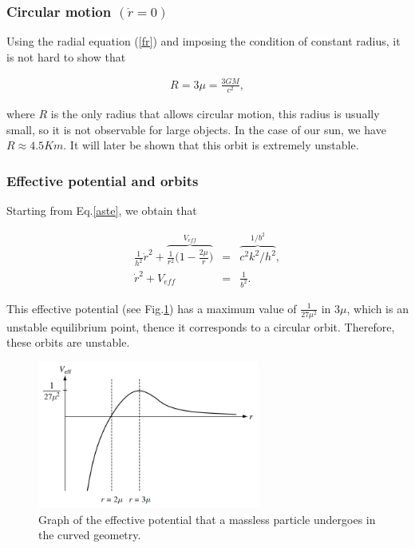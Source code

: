 \documentclass[letterpaper,11pt,onecolumn]{article}
\begin{document}
\subsubsection{Circular motion $(\dot{r}=0)$}

Using the radial equation (\ref{fr}) and imposing the condition of constant radius, it is not hard to show that

\begin{eqnarray*}
          R=3\mu=\frac{3GM}{c^{2}},
\end{eqnarray*}

where $R$ is the only radius that allows circular motion, this radius is usually small, so it is not observable for large objects. In the case of our sun, we have $R \approx 4.5 Km$. It will later be shown that this orbit is extremely unstable.

\subsubsection{Effective potential and orbits}

Starting from Eq.\ref{aste}, we obtain that

\begin{eqnarray}
      \frac{1}{h^{2}}\dot{r}^{2}+\overbrace{\frac{1}{r^{2}}\Big( 1- \frac{2\mu}{r}\Big)}^{V_{eff}}&=& \overbrace{c^{2}k^{2}/h^{2}}^{1/b^{2}}, \nonumber\\
      \dot{r}^{2}+V_{eff}&=& \frac{1}{b^{2}}. \label{Veff}
\end{eqnarray}
    
This effective potential (see Fig.\ref{fpot}) has a maximum value of $\frac{1}{ 27\mu^{2}}$ in $3\mu$, which is an unstable equilibrium point, thence it corresponds to a circular orbit. Therefore, these orbits are unstable.
 
\begin{figure}[h!]
    \centering
    \includegraphics[width=0.65\textwidth]{Report/Images/3_poten.png}
    \caption{Graph of the effective potential that a massless particle undergoes in the curved geometry.}
\label{fpot}
\end{figure}
\end{document}
